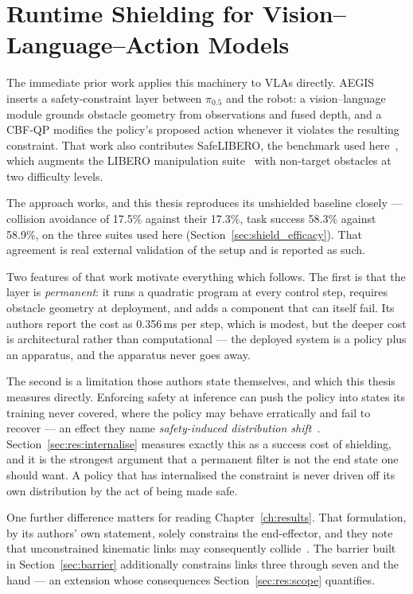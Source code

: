 \section{Runtime Shielding for Vision--Language--Action Models}\label{sec:bg:shielding}

The immediate prior work applies this machinery to VLAs directly. AEGIS inserts a safety-constraint
layer between $\pi_{0.5}$ and the robot: a vision--language module grounds obstacle geometry from
observations and fused depth, and a CBF-QP modifies the policy's proposed action whenever it
violates the resulting constraint. That work also contributes SafeLIBERO, the benchmark used
here~\cite{vlsa2026}, which augments the LIBERO manipulation suite~\cite{liu2023libero} with
non-target obstacles at two difficulty levels.

The approach works, and this thesis reproduces its unshielded baseline closely --- collision
avoidance of 17.5\% against their 17.3\%, task success 58.3\% against 58.9\%, on the three suites
used here (Section~\ref{sec:shield_efficacy}). That agreement is real external validation of the
setup and is reported as such.

Two features of that work motivate everything which follows. The first is that the layer is
\emph{permanent}: it runs a quadratic program at every control step, requires obstacle geometry at
deployment, and adds a component that can itself fail. Its authors report the cost as 0.356\,ms per
step, which is modest, but the deeper cost is architectural rather than computational --- the
deployed system is a policy plus an apparatus, and the apparatus never goes away.

The second is a limitation those authors state themselves, and which this thesis measures directly.
Enforcing safety at inference can push the policy into states its training never covered, where the
policy may behave erratically and fail to recover --- an effect they name \emph{safety-induced
distribution shift}~\cite{vlsa2026}. Section~\ref{sec:res:internalise} measures exactly this as a
success cost of shielding, and it is the strongest argument that a permanent filter is not the end
state one should want. A policy that has internalised the constraint is never driven off its own
distribution by the act of being made safe.

One further difference matters for reading Chapter~\ref{ch:results}. That formulation, by its
authors' own statement, solely constrains the end-effector, and they note that unconstrained
kinematic links may consequently collide~\cite{vlsa2026}. The barrier built in
Section~\ref{sec:barrier} additionally constrains links three through seven and the hand --- an
extension whose consequences Section~\ref{sec:res:scope} quantifies.

